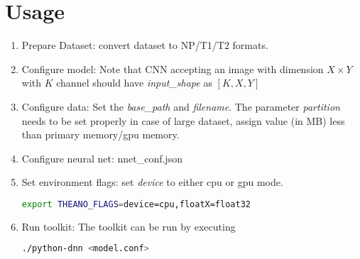 \section{Usage}

\begin{enumerate}
	\item Prepare Dataset: convert dataset to NP/T1/T2 formats.
	\item Configure model: Note that CNN accepting an image with dimension $X \times Y$ with $K$ channel should have \textit{input\_shape} as $[K,X,Y]$
	\item Configure data: Set the \textit{base\_path} and \textit{filename}.  The parameter \textit{partition} needs to be set properly in case of large dataset, assign value (in MB) less than primary memory/gpu memory. 
	\item Configure neural net: nnet\_conf.json
	\item Set environment flags: set \textit{device} to either cpu or gpu mode.
	\begin{lstlisting}[language=bash,basicstyle=\small] 
		export THEANO_FLAGS=device=cpu,floatX=float32
	\end{lstlisting}
	\item Run toolkit: The toolkit can be run by executing
	\begin{lstlisting}[language=bash,basicstyle=\small] 
		./python-dnn <model.conf>
	\end{lstlisting}
\end{enumerate}
